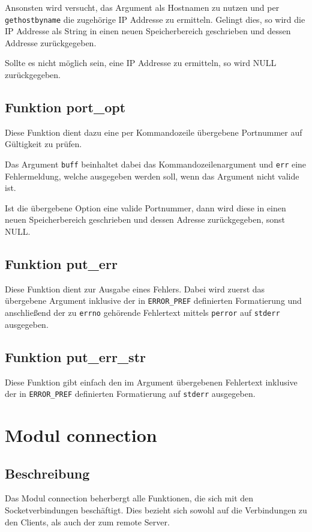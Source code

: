 \documentclass[pdftex,final,a4paper,10pt,notitlepage,halfparskip]{scrreprt}
\begin{document}
Ansonsten wird versucht, das Argument als Hostnamen zu nutzen und per \texttt{gethostbyname} die zugehörige IP Addresse zu ermitteln. Gelingt dies, so wird die IP Addresse als String in einen neuen Speicherbereich geschrieben und dessen Addresse zurückgegeben.

Sollte es nicht möglich sein, eine IP Addresse zu ermitteln, so wird NULL zurückgegeben.
\subsection{Funktion port\_opt}\label{fn:port_opt}
Diese Funktion dient dazu eine per Kommandozeile übergebene Portnummer auf Gültigkeit zu prüfen.

Das Argument \texttt{buff} beinhaltet dabei das Kommandozeilenargument und \texttt{err} eine Fehlermeldung, welche ausgegeben werden soll, wenn das Argument nicht valide ist.

Ist die übergebene Option eine valide Portnummer, dann wird diese in einen neuen Speicherbereich geschrieben und dessen Adresse zurückgegeben, sonst NULL.

\subsection{Funktion put\_err}\label{fn:put_err}
Diese Funktion dient zur Ausgabe eines Fehlers. Dabei wird zuerst das übergebene Argument inklusive der in \texttt{ERROR\_PREF} definierten Formatierung und anschließend der zu \texttt{errno} gehörende Fehlertext mittels \texttt{perror} auf \texttt{stderr} ausgegeben.

\subsection{Funktion put\_err\_str}\label{fn:put_err_str}
Diese Funktion gibt einfach den im Argument übergebenen Fehlertext inklusive der in \texttt{ERROR\_PREF} definierten Formatierung auf \texttt{stderr} ausgegeben.

\section{Modul connection}\label{mod:connection}
\subsection{Beschreibung}
Das Modul connection beherbergt alle Funktionen, die sich mit den Socketverbindungen beschäftigt. Dies bezieht sich sowohl auf die Verbindungen zu den Clients, als auch der zum remote Server.
\end{document}
